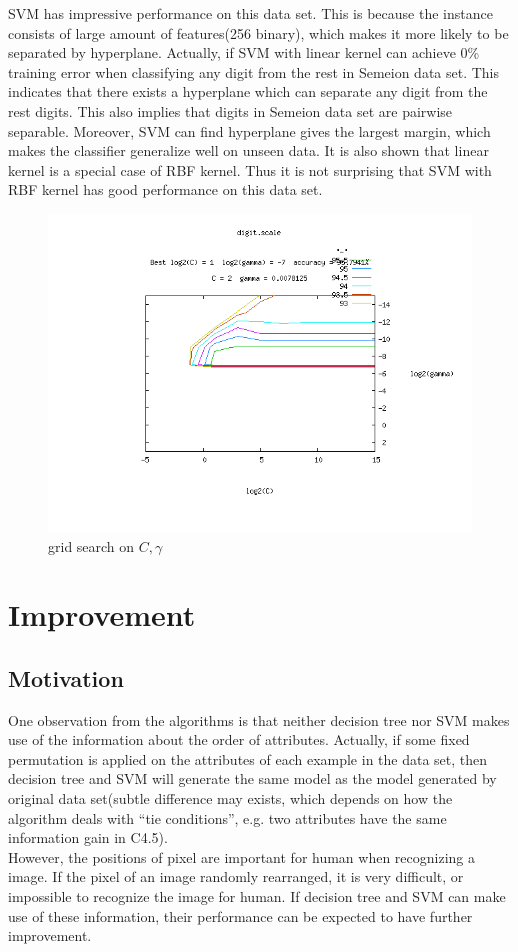 \documentclass[a4paper,11pt]{article}
\begin{document}
SVM has impressive performance on this data set. This is because the instance consists of large amount of features(256 binary), which makes it more likely to be separated by hyperplane. Actually, if SVM with linear kernel can achieve 0\% training error when classifying any digit from the rest in Semeion data set. This indicates that there exists a hyperplane which can separate any digit from the rest digits. This also implies that digits in Semeion data set are pairwise separable. Moreover, SVM can find hyperplane gives the largest margin, which makes the classifier generalize well on unseen data. It is also shown that linear kernel is a special case of RBF kernel\cite{ssk,ll}. Thus it is not surprising that SVM with RBF kernel has good performance on this data set.

\begin{figure}
\centering
\includegraphics[width=1.0\textwidth]{digit}
\caption{grid search on $C,\gamma$}
\end{figure}

\section{Improvement}
\subsection{Motivation}
One observation from the algorithms is that neither decision tree nor SVM makes use of the information about the order of attributes. Actually, if some fixed permutation is applied on the attributes of each example in the data set, then decision tree and SVM will generate the same model as the model generated by original data set(subtle difference may exists, which depends on how the algorithm deals with ``tie conditions'', e.g. two attributes have the same information gain in C4.5).\\
However, the positions of pixel are important for human when recognizing a image. If the pixel of an image randomly rearranged, it is very difficult, or impossible to recognize the image for human. If decision tree and SVM can make use of these information, their performance can be expected to have further improvement.\\
\end{document}
